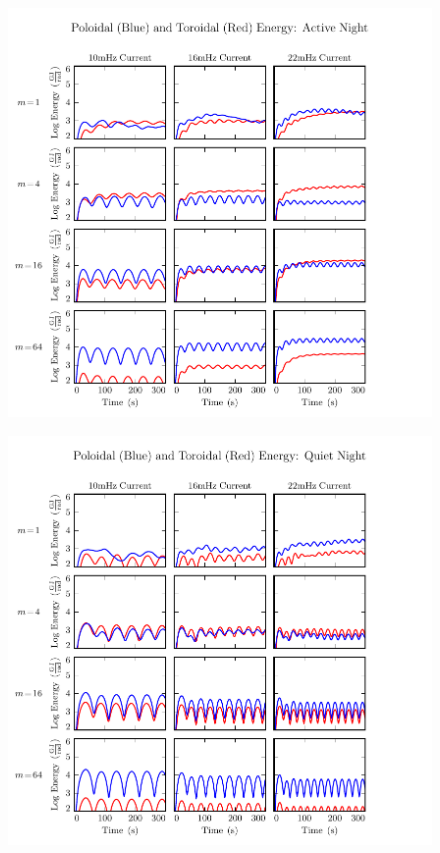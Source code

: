 \begin{figure}[H]
    \centering
    \includegraphics[width=\textwidth]{figures/UP_UT_J_3.pdf}
    \caption[Current-Driven Poloidal and Toroidal Energy: Active Night]{}
    \label{fig_UP_UT_J_3}
\end{figure}

\begin{figure}[H]
    \centering
    \includegraphics[width=\textwidth]{figures/UP_UT_J_4.pdf}
    \caption[Current-Driven Poloidal and Toroidal Energy: Quiet Night]{}
    \label{fig_UP_UT_J_4}
\end{figure}

